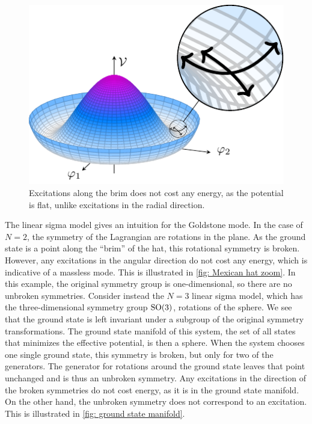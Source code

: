 \begin{figure}[ht]
    \centering
    \hspace*{2.5cm}
    \includegraphics[width=.6\linewidth]{figurer/mexican_hat_zoom.pdf}
    \caption{Excitations along the brim does not cost any energy, as the potential is flat, unlike excitations in the radial direction.}
    \label{fig: Mexican hat zoom}
\end{figure}

The linear sigma model gives an intuition for the Goldstone mode.
In the case of $N = 2$, the symmetry of the Lagrangian are rotations in the plane.
As the ground state is a point along the ``brim'' of the hat, this rotational symmetry is broken.
However, any excitations in the angular direction do not cost any energy, which is indicative of a massless mode.
This is illustrated in \autoref{fig: Mexican hat zoom}.
In this example, the original symmetry group is one-dimensional, so there are no unbroken symmetries.
Consider instead the $N=3$ linear sigma model, which has the three-dimensional symmetry group $\text{SO}(3)$, rotations of the sphere.
We see that the ground state is left invariant under a subgroup of the original symmetry transformations.
The ground state manifold of this system, the set of all states that minimizes the effective potential, is then a sphere.
When the system chooses one single ground state, this symmetry is broken, but only for two of the generators. 
The generator for rotations around the ground state leaves that point unchanged and is thus an unbroken symmetry.
Any excitations in the direction of the broken symmetries do not cost energy, as it is in the ground state manifold.
On the other hand, the unbroken symmetry does not correspond to an excitation.
This is illustrated in \autoref{fig: ground state manifold}.

